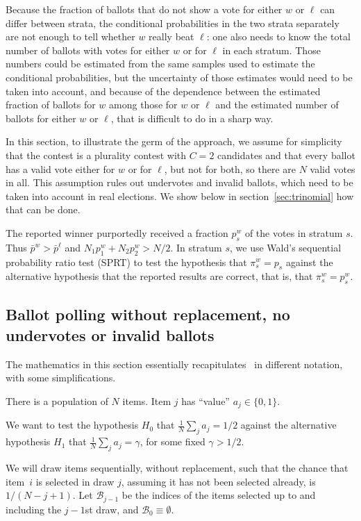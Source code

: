 \documentclass[12pt]{article}
\newcommand{\bp}{\bar{p}}
\begin{document}
Because the fraction of ballots that do not show a vote for either $w$ or $\ell$ can differ
between strata, the conditional probabilities in the two strata separately are not enough
to tell whether $w$ really beat $\ell$: one also needs to know the total number of ballots with votes 
for either $w$ or for $\ell$ in each stratum.
Those numbers could be estimated from the same samples used to estimate the conditional 
probabilities, but the uncertainty of those estimates would need to be taken into account, and 
because of the dependence between the estimated fraction of ballots for $w$ among those for $w$ or $\ell$
and the estimated number of ballots for either $w$ or $\ell$, that is difficult to do in a sharp way.

In this section, to illustrate the germ of the approach,
we assume for simplicity that the contest is a plurality contest with $C=2$ candidates and
that every ballot
has a valid vote either for $w$ or for $\ell$, but not for both, so there are $N$ valid votes in all.
This assumption rules out undervotes and invalid ballots, which need to be taken into
account in real elections. 
We show below in section~\ref{sec:trinomial} how that can be done.

The reported winner purportedly received a fraction $p_s^w$ of the votes in stratum $s$.
Thus $\bp^w > \bp^\ell$ and $N_1 p_1^w + N_2p_2^w > N/2$.
In stratum $s$, we use Wald's sequential probability ratio test (SPRT) to
test the hypothesis that $\pi_s^w = p_s$ against the alternative hypothesis 
that the reported results are correct, that is, that $\pi_s^w = p_s^w$.


\subsection{Ballot polling without replacement, no undervotes or invalid ballots}
The mathematics in this section essentially 
recapitulates~\citet[pp43--44]{wald45} in different notation, with some simplifications.

There is a population of $N$ items. 
Item $j$ has ``value'' $a_j \in \{0, 1\}$. 

We want to test the hypothesis $H_0$ that $\frac{1}{N}\sum_j a_j = 1/2$ against the
alternative hypothesis $H_1$ that $\frac{1}{N}\sum_j a_j = \gamma$, for some
fixed $\gamma > 1/2$.

We will draw items sequentially, without replacement, such that the chance that 
item~$i$ is selected in draw $j$, assuming it has not been selected already, is $1/(N-j+1)$.
Let ${\mathcal B_{j-1}}$ be the indices of the items selected up to and including the $j-1$st draw,
and ${\mathcal B_0} \equiv \emptyset$. 
\end{document}
